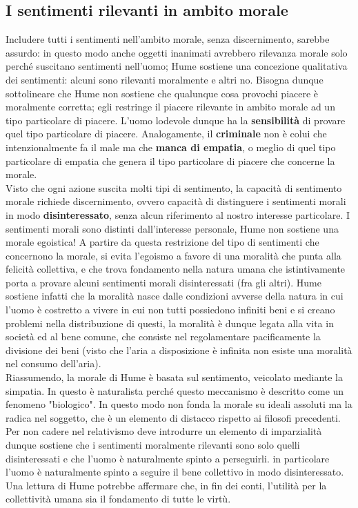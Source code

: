 \documentclass[10pt,a4paper]{article}
\begin{document}
\subsection{I sentimenti rilevanti in ambito morale}
Includere tutti i sentimenti nell'ambito morale, senza discernimento, sarebbe assurdo: in questo modo anche oggetti inanimati avrebbero rilevanza morale solo perché suscitano sentimenti nell'uomo; Hume sostiene una concezione qualitativa dei sentimenti: alcuni sono rilevanti moralmente e altri no. Bisogna dunque sottolineare che Hume non sostiene che qualunque cosa provochi piacere è moralmente corretta; egli restringe il piacere rilevante in ambito morale ad un tipo particolare di piacere. L'uomo lodevole dunque ha la \textbf{sensibilità} di provare quel tipo particolare di piacere. Analogamente, il \textbf{criminale} non è colui che intenzionalmente fa il male ma che \textbf{manca di empatia}, o meglio di quel tipo particolare di empatia che genera il tipo particolare di piacere che concerne la morale.\\
Visto che ogni azione suscita molti tipi di sentimento, la capacità di sentimento morale richiede discernimento, ovvero capacità di distinguere i sentimenti morali in modo \textbf{disinteressato}, senza alcun riferimento al nostro interesse particolare. I sentimenti morali sono distinti dall'interesse personale, Hume non sostiene una morale egoistica!
A partire da questa restrizione del tipo di sentimenti che concernono la morale, si evita l'egoismo a favore di una moralità che punta alla felicità collettiva, e che trova fondamento nella natura umana che istintivamente porta a provare alcuni sentimenti morali disinteressati (fra gli altri). Hume sostiene infatti che la moralità nasce dalle condizioni avverse della natura in cui l'uomo è costretto a vivere in cui non tutti possiedono infiniti beni e si creano problemi nella distribuzione di questi, la moralità è dunque legata alla vita in società ed al bene comune, che consiste nel regolamentare pacificamente la divisione dei beni (visto che l'aria a disposizione è infinita non esiste una moralità nel consumo dell'aria).\\
Riassumendo, la morale di Hume è basata sul sentimento, veicolato mediante la simpatia. In questo è naturalista perché questo meccanismo è descritto come un fenomeno "biologico". In questo modo non fonda la morale su ideali assoluti ma la radica nel soggetto, che è un elemento di distacco rispetto ai filosofi precedenti. Per non cadere nel relativismo deve introdurre un elemento di imparzialità dunque sostiene che i sentimenti moralmente rilevanti sono solo quelli disinteressati e che l'uomo è naturalmente spinto a perseguirli. in particolare l'uomo è naturalmente spinto a seguire il bene collettivo in modo disinteressato. Una lettura di Hume potrebbe affermare che, in fin dei conti, l'utilità per la collettività umana sia il fondamento di tutte le virtù.
\end{document}
